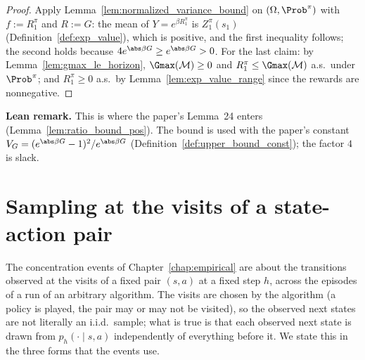 \begin{proof}
\leanok
Apply Lemma~\ref{lem:normalized_variance_bound} on $(\Omega, \Prob^\pi)$ with $f := R^\pi_1$ and
$R := G$: the mean of $Y = e^{\beta R^\pi_1}$ is $Z^\pi_1(s_1)$ (Definition~\ref{def:exp_value}),
which is positive, and the first inequality follows; the second holds because
$4e^{\abs\beta G} \ge e^{\abs\beta G} > 0$. For the last claim: by
Lemma~\ref{lem:gmax_le_horizon}, $\Gmax(\mathcal M) \ge 0$ and $R^\pi_1 \le \Gmax(\mathcal M)$
a.s.\ under $\Prob^\pi$; and $R^\pi_1 \ge 0$ a.s.\ by Lemma~\ref{lem:exp_value_range} since the
rewards are nonnegative.
\end{proof}

\textbf{Lean remark.} This is where the paper's Lemma~24 enters (Lemma~\ref{lem:ratio_bound_pos}).
The bound is used with the paper's constant $V_G = (e^{\abs\beta G} - 1)^2/e^{\abs\beta G}$
(Definition~\ref{def:upper_bound_const}); the factor $4$ is slack.

\section{Sampling at the visits of a state-action pair}
\label{sec:pre_mdp_visits}

The concentration events of Chapter~\ref{chap:empirical} are about the transitions observed
at the visits of a fixed pair $(s, a)$ at a fixed step $h$, across the episodes of a run of an
arbitrary algorithm. The visits are chosen by the algorithm (a policy is played, the pair may
or may not be visited), so the observed next states are not literally an i.i.d.\ sample;
what is true is that each observed next state is drawn from $p_h(\cdot \mid s, a)$
independently of everything before it. We state this in the three forms that the events use.

